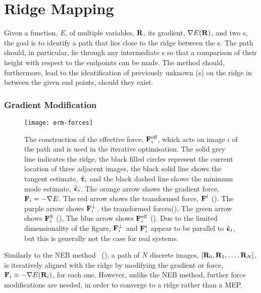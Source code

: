 \section{Ridge Mapping}
\label{sec:ridge-mapping}
Given a function, $E$, of multiple variables, ${\mathrm{\mathbf{\bm{R}}}}$, its gradient, $\nabla E({\mathrm{\mathbf{\bm{R}}}})$, and two s, the goal is to identify a path that lies close to the ridge between the s.
The path should, in particular, lie through any intermediate s so that a comparison of their height with respect to the endpoints can be made.
The method should, furthermore, lead to the identification of previously unknown (s) on the ridge in between the given end points, should they exist.

\subsubsection{Gradient Modification}
\begin{SCfigure}[5.0][h]
\centering
\texttt{[image: erm-forces]}
\caption{
The construction of the effective force, ${\mathrm{\mathbf{\bm{F}}}}^\text{eff}_i$,
which acts on image $i$ of the path and is used in the iterative optimisation.
The solid grey line indicates the ridge,
the black filled circles represent the current location of three adjacent images,
the black solid line shows the tangent estimate, $\hat{{\mathrm{\mathbf{\bm{\uptau}}}}}_i$
and the black dashed line shows the minimum mode estimate, $\hat{{\mathrm{\mathbf{\bm{\upepsilon}}}}}_i$.
The orange arrow shows the gradient force, ${\mathrm{\mathbf{\bm{F}}}}_i= -\nabla E$.
The red arrow shows the transformed force, ${\mathrm{\mathbf{\bm{F}}}}^t$ ().
The purple arrow shows ${\mathrm{\mathbf{\bm{F}}}}_i^\perp$, the transformed forcea(), 
The green arrow shows ${\mathrm{\mathbf{\bm{F}}}}_i^\text{S}$ (),
The blue arrow shows ${\mathrm{\mathbf{\bm{F}}}}_i^\text{eff}$ ().
Due to the limited dimensionality of the figure, ${\mathrm{\mathbf{\bm{F}}}}_i^\perp$ and ${\mathrm{\mathbf{\bm{F}}}}_i^\text{t}$ appear to be parallel to $\hat{{\mathrm{\mathbf{\bm{\upepsilon}}}}}_i$, but this is generally not the case for real systems.
}
\label{fig:erm-forces}
\end{SCfigure}

Similarly to the NEB method~\cite{neb-original-1998} (), a path of $N$ discrete images, $[{\mathrm{\mathbf{\bm{R}}}}_0, {\mathrm{\mathbf{\bm{R}}}}_1, \ldots, {\mathrm{\mathbf{\bm{R}}}}_N]$, is iteratively aligned with the ridge by modifying the gradient or force, ${\mathrm{\mathbf{\bm{F}}}}_i \equiv -\nabla E({\mathrm{\mathbf{\bm{R}}}}_i)$, for each one.
However, unlike the NEB method, further force modifications are needed, in order to converge to a ridge rather than a MEP.

